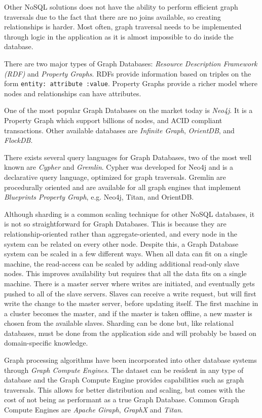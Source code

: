 Other NoSQL solutions does not have the ability to perform efficient graph traversals due to the fact that there are no joins available, so creating relationships is harder. Most often, graph traversal needs to be implemented through logic in the application as it is almost impossible to do inside the database.

There are two major types of Graph Databases: \emph{Resource Description Framework (RDF)} and \emph{Property Graphs}. RDFs provide information based on triples on the form \texttt{entity: attribute :value}. Property Graphs provide a richer model where nodes and relationships can have attributes.

One of the most popular Graph Databases on the market today is \emph{Neo4j}. It is a Property Graph which support billions of nodes, and ACID compliant transactions. Other available databases are \emph{Infinite Graph}, \emph{OrientDB}, and \emph{FlockDB}.

There exists several query languages for Graph Databases, two of the most well known are \emph{Cypher} and \emph{Gremlin}. Cypher was developed for Neo4j and is a declarative query language, optimized for graph traversals. Gremlin are procedurally oriented and are available for all graph engines that implement \emph{Blueprints Property Graph}, e.g. Neo4j, Titan, and OrientDB.

Although sharding is a common scaling technique for other NoSQL databases, it is not so straightforward for Graph Databases. This is because they are relationship-oriented rather than aggregate-oriented, and every node in the system can be related on every other node. Despite this, a Graph Database system can be scaled in a few different ways. When all data can fit on a single machine, the read-access can be scaled by adding additional read-only slave nodes. This improves availability but requires that all the data fits on a single machine. There is a master server where writes are initiated, and eventually gets pushed to all of the slave servers. Slaves can receive a write request, but will first write the change to the master server, before updating itself. The first machine in a cluster becomes the master, and if the master is taken offline, a new master is chosen from the available slaves. Sharding can be done but, like relational databases, must be done from the application side and will probably be based on domain-specific knowledge.

Graph processing algorithms have been incorporated into other database systems through \emph{Graph Compute Engines}. The dataset can be resident in any type of database and the Graph Compute Engine provides capabilities such as graph traversals. This allows for better distribution and scaling, but comes with the cost of not being as performant as a true Graph Database. Common Graph Compute Engines are \emph{Apache Giraph}, \emph{GraphX} and \emph{Titan}.

